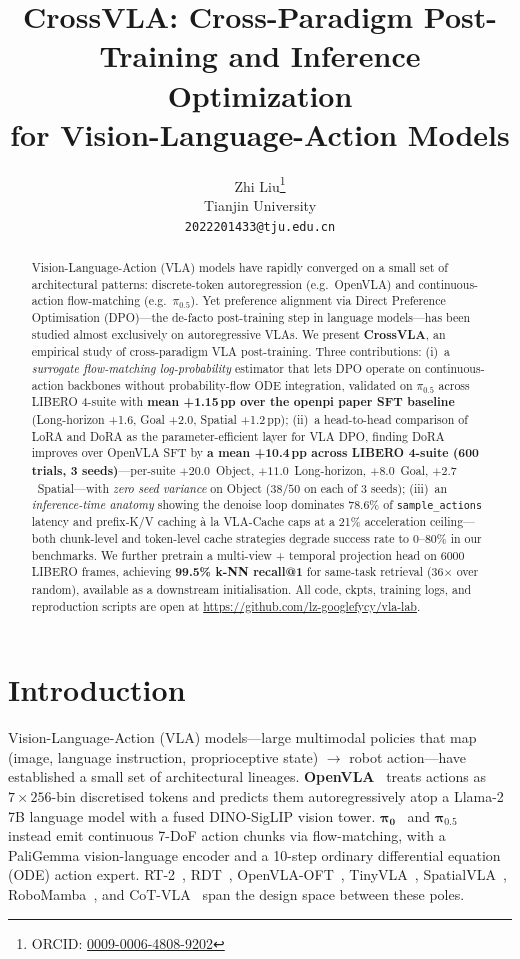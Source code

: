 \documentclass{article}
\title{CrossVLA: Cross-Paradigm Post-Training and Inference Optimization\\for Vision-Language-Action Models}
\author{%
  Zhi Liu\thanks{ORCID: \href{https://orcid.org/0009-0006-4808-9202}{0009-0006-4808-9202}}\\
  Tianjin University\\
  \texttt{2022201433@tju.edu.cn}\\
}
\begin{document}
\maketitle

\begin{abstract}
Vision-Language-Action (VLA) models have rapidly converged on a small set of architectural patterns: discrete-token autoregression (e.g.\ OpenVLA) and continuous-action flow-matching (e.g.\ \(\pi_{0.5}\)). Yet preference alignment via Direct Preference Optimisation (DPO)---the de-facto post-training step in language models---has been studied almost exclusively on autoregressive VLAs. We present \textbf{CrossVLA}, an empirical study of cross-paradigm VLA post-training. Three contributions: (i)~a \emph{surrogate flow-matching log-probability} estimator that lets DPO operate on continuous-action backbones without probability-flow ODE integration, validated on \(\pi_{0.5}\) across LIBERO 4-suite with \textbf{mean +1.15\,pp over the openpi paper SFT baseline} (Long-horizon +1.6, Goal +2.0, Spatial +1.2\,pp); (ii)~a head-to-head comparison of LoRA and DoRA as the parameter-efficient layer for VLA DPO, finding DoRA improves over OpenVLA SFT by \textbf{a mean +10.4\,pp across LIBERO 4-suite (600 trials, 3 seeds)}---per-suite \(+20.0\)~Object, \(+11.0\)~Long-horizon, \(+8.0\)~Goal, \(+2.7\)~Spatial---with \emph{zero seed variance} on Object (\(38{/}50\) on each of 3 seeds); (iii)~an \emph{inference-time anatomy} showing the denoise loop dominates 78.6\% of \texttt{sample\_actions} latency and prefix-K/V caching \`{a} la VLA-Cache caps at a 21\% acceleration ceiling---both chunk-level and token-level cache strategies degrade success rate to 0--80\% in our benchmarks. We further pretrain a multi-view + temporal projection head on 6000 LIBERO frames, achieving \textbf{99.5\% k-NN recall@1} for same-task retrieval (36\(\times\) over random), available as a downstream initialisation. All code, ckpts, training logs, and reproduction scripts are open at \url{https://github.com/lz-googlefycy/vla-lab}.
\end{abstract}

\section{Introduction}

Vision-Language-Action (VLA) models---large multimodal policies that map (image, language instruction, proprioceptive state) \(\rightarrow\) robot action---have established a small set of architectural lineages. \textbf{OpenVLA}~\cite{kim2024openvla} treats actions as \(7 \times 256\)-bin discretised tokens and predicts them autoregressively atop a Llama-2 7B language model with a fused DINO-SigLIP vision tower. \(\boldsymbol{\pi_0}\)~\cite{black2024pi0} and \(\boldsymbol{\pi_{0.5}}\)~\cite{openpi2025pi05} instead emit continuous 7-DoF action chunks via flow-matching, with a PaliGemma vision-language encoder and a 10-step ordinary differential equation (ODE) action expert. RT-2~\cite{brohan2023rt2}, RDT~\cite{liu2024rdt}, OpenVLA-OFT~\cite{kim2025openvlaoft}, TinyVLA~\cite{wen2024tinyvla}, SpatialVLA~\cite{spatialvla2025}, RoboMamba~\cite{robomamba2024}, and CoT-VLA~\cite{cotvla2025} span the design space between these poles.
\end{document}
